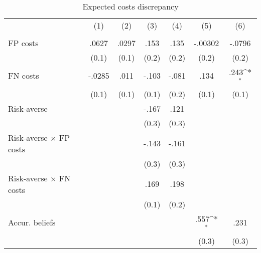 \begin{table}[htbp]\centering
\def\sym#1{\ifmmode^{#1}\else\(^{#1}\)\fi}
\caption{Expected costs discrepancy}
\begin{tabular}{l*{6}{c}}
\hline\hline
                &\multicolumn{1}{c}{(1)}&\multicolumn{1}{c}{(2)}&\multicolumn{1}{c}{(3)}&\multicolumn{1}{c}{(4)}&\multicolumn{1}{c}{(5)}&\multicolumn{1}{c}{(6)}\\
                &\multicolumn{1}{c}{}&\multicolumn{1}{c}{}&\multicolumn{1}{c}{}&\multicolumn{1}{c}{}&\multicolumn{1}{c}{}&\multicolumn{1}{c}{}\\
\hline
FP costs        &    .0627         &    .0297         &     .153         &     .135         &  -.00302         &   -.0796         \\
                &    (0.1)         &    (0.1)         &    (0.2)         &    (0.2)         &    (0.2)         &    (0.2)         \\
FN costs        &   -.0285         &     .011         &    -.103         &    -.081         &     .134         &     .243\sym{*}  \\
                &    (0.1)         &    (0.1)         &    (0.1)         &    (0.2)         &    (0.1)         &    (0.1)         \\
Risk-averse     &                  &                  &    -.167         &     .121         &                  &                  \\
                &                  &                  &    (0.3)         &    (0.3)         &                  &                  \\
Risk-averse $\times$ FP costs&                  &                  &    -.143         &    -.161         &                  &                  \\
                &                  &                  &    (0.3)         &    (0.3)         &                  &                  \\
Risk-averse $\times$ FN costs&                  &                  &     .169         &     .198         &                  &                  \\
                &                  &                  &    (0.1)         &    (0.2)         &                  &                  \\
Accur. beliefs  &                  &                  &                  &                  &     .557\sym{*}  &     .231         \\
                &                  &                  &                  &                  &    (0.3)         &    (0.3)         \\

\end{tabular}
\end{table}
